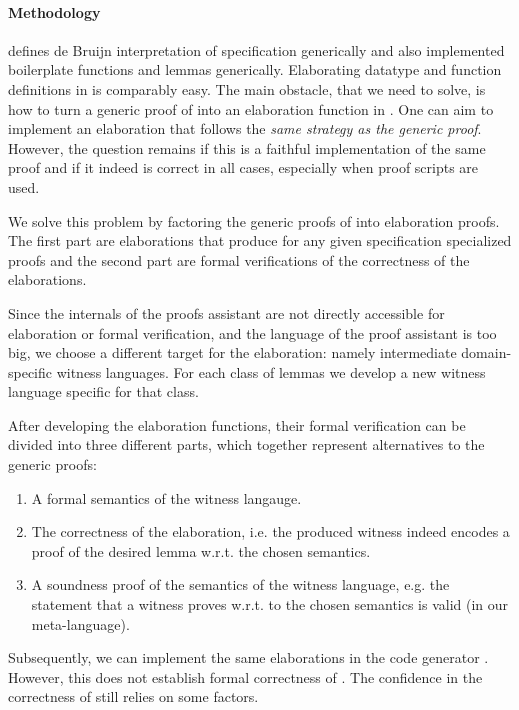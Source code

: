 \paragraph{Methodology}
\Loom defines de Bruijn interpretation of \Knot specification generically and
also implemented boilerplate functions and lemmas generically. Elaborating
datatype and function definitions in \Needle is comparably easy. The main
obstacle, that we need to solve, is how to turn a generic proof of \Loom into an
elaboration function in \Needle. One can aim to implement an elaboration that
follows the \emph{same strategy as the generic proof}. However, the question
remains if this is a faithful implementation of the same proof and if it indeed
is correct in all cases, especially when proof scripts are used.

We solve this problem by factoring the generic proofs of \Loom into elaboration
proofs. The first part are elaborations that produce for any given specification
specialized proofs and the second part are formal verifications of the
correctness of the elaborations.

Since the internals of the proofs assistant are not directly accessible for
elaboration or formal verification, and the language of the proof assistant is
too big, we choose a different target for the elaboration: namely intermediate
domain-specific witness languages. For each class of lemmas we develop a new
witness language specific for that class.

After developing the elaboration functions, their formal verification can be
divided into three different parts, which together represent alternatives to the
generic proofs:
\begin{enumerate}
\item A formal semantics of the witness langauge.
\item The correctness of the elaboration, i.e. the produced witness indeed
  encodes a proof of the desired lemma w.r.t. the chosen semantics.
\item A soundness proof of the semantics of the witness language, e.g. the
  statement that a witness proves w.r.t. to the chosen semantics is valid (in
  our meta-language).
\end{enumerate}

Subsequently, we can implement the same elaborations in the code generator
\Needle. However, this does not establish formal correctness of \Needle. The
confidence in the correctness of \Needle still relies on some factors.

